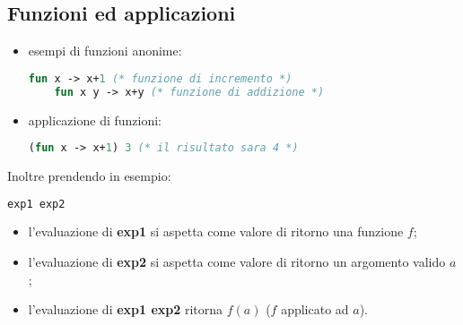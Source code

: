 \subsection{Funzioni ed applicazioni}
\begin{itemize}
  \item esempi di funzioni anonime:
    \begin{lstlisting}[language=Caml, caption={Esempio di funzioni anonime}]
    fun x -> x+1 (* funzione di incremento *)
    fun x y -> x+y (* funzione di addizione *)
    \end{lstlisting}
  \item applicazione di funzioni:
    \begin{lstlisting}[language=Caml, caption={Esempio di applicazione di funzioni}]
    (fun x -> x+1) 3 (* il risultato sara 4 *)
    \end{lstlisting}
\end{itemize}

Inoltre prendendo in esempio:
\begin{lstlisting}[language=Caml, caption={Esempio di applicazioni}]
  exp1 exp2
\end{lstlisting}
\begin{itemize}
  \item l'evaluazione di \textbf{exp1} si aspetta come valore di ritorno una
    funzione $f$;
  \item l'evaluazione di \textbf{exp2} si aspetta come valore di ritorno un
    argomento valido $a$;
  \item l'evaluazione di \textbf{exp1 exp2} ritorna $f(a)$ ($f$ applicato ad
    $a$).
\end{itemize}

